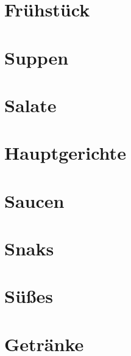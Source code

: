 \documentclass[a4paper]{scrartcl}
\begin{document}
\section{Frühstück} %


\section{Suppen} %

\section{Salate} %
%

\section{Hauptgerichte} %


%

\section{Saucen} %
%
%
%
%
%
%
%
%

\section{Snaks} %
%

\section{Süßes} %


\section{Getränke} %
\end{document}
